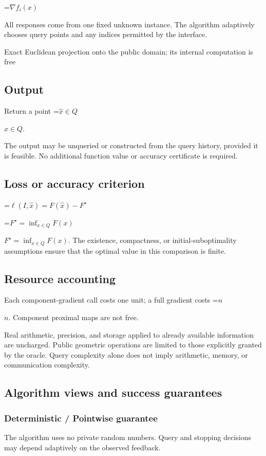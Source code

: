 \documentclass[10pt,a4paper]{article}
\newcommand{\AtlasMath}[1]{\par\begingroup\centering\setbox0=\hbox{$\displaystyle #1$}\ifdim\wd0>1.4\linewidth\typeout{ATLAS WIDE FORMULA: \the\wd0}\fi\ifdim\wd0>\linewidth\resizebox{\linewidth}{!}{\box0}\else\box0\fi\par\endgroup}
\newcommand{\AtlasInlineMath}[1]{\begingroup\setbox0=\hbox{$#1$}\ifdim\wd0>.4\linewidth\endgroup\AtlasMath{#1}\else\endgroup$#1$\fi}
\begin{document}
\AtlasMath{\nabla f_i(x)}


All responses come from one fixed unknown instance. The algorithm adaptively chooses query points and any indices permitted by the interface.

Exact Euclidean projection onto the public domain; its internal computation is free

\subsection{Output}
Return a point \AtlasInlineMath{\widehat x\in Q}.

The output may be unqueried or constructed from the query history, provided it is feasible. No additional function value or accuracy certificate is required.

\subsection{Loss or accuracy criterion}

\AtlasMath{\ell(I,\widehat{x})=F(\widehat{x})-F^\star}


\AtlasInlineMath{F^\star=\inf_{x\in Q}F(x)}. The existence, compactness, or initial-suboptimality assumptions ensure that the optimal value in this comparison is finite.

\subsection{Resource accounting}
Each component-gradient call costs one unit; a full gradient costs \AtlasInlineMath{n}. Component proximal maps are not free.

Real arithmetic, precision, and storage applied to already available information are uncharged. Public geometric operations are limited to those explicitly granted by the oracle. Query complexity alone does not imply arithmetic, memory, or communication complexity.

\subsection{Algorithm views and success guarantees}
\subsubsection{Deterministic / Pointwise guarantee}
The algorithm uses no private random numbers. Query and stopping decisions may depend adaptively on the observed feedback.
\end{document}
